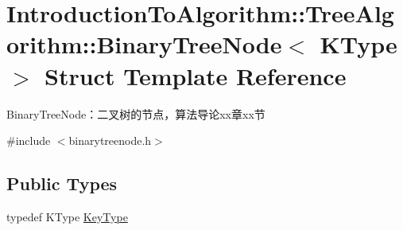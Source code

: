 \hypertarget{struct_introduction_to_algorithm_1_1_tree_algorithm_1_1_binary_tree_node}{}\section{Introduction\+To\+Algorithm\+:\+:Tree\+Algorithm\+:\+:Binary\+Tree\+Node$<$ K\+Type $>$ Struct Template Reference}
\label{struct_introduction_to_algorithm_1_1_tree_algorithm_1_1_binary_tree_node}


Binary\+Tree\+Node：二叉树的节点，算法导论xx章xx节  




{\ttfamily \#include $<$binarytreenode.\+h$>$}

\subsection*{Public Types}
\begin{DoxyCompactItemize}
\item 
typedef K\+Type \hyperlink{struct_introduction_to_algorithm_1_1_tree_algorithm_1_1_binary_tree_node_adbd8539e7a907c3a8fe7a8b79e7032e8}{Key\+Type}
\end{DoxyCompactItemize}
